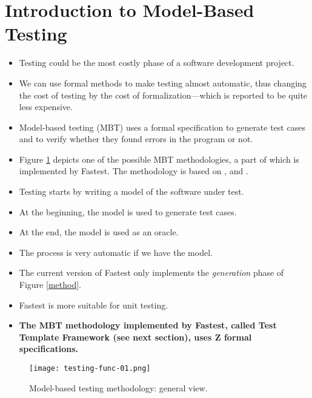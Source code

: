 \section{Introduction to Model-Based Testing}

\begin{itemize}
\item Testing could be the most costly phase of a software development project.

\item We can use formal methods to make testing almost automatic, thus changing the cost of testing by the cost of formalization---which is reported to be quite less expensive.

\item Model-based testing (MBT) uses a formal specification to generate test cases and to verify whether they found errors in the program or not.

\item Figure \ref{f:mbt} depicts one of the possible MBT methodologies, a part of which is implemented by Fastest. The methodology is based on \cite{Stocks2}, \cite{Horcher} and \cite{Stocks}.

\item Testing starts by writing a model of the software under test.

\item At the beginning, the model is used to generate test cases.

\item At the end, the model is used as an oracle.

\item The process is very automatic if we have the model.

\item The current version of Fastest only implements the {\it generation} phase of Figure \ref{method}.

\item Fastest is more suitable for unit testing.

\item {\bf The MBT methodology implemented by Fastest, called Test Template Framework (see next section), uses Z formal specifications.}
\end{itemize}

\begin{figure}[h]
\begin{center}
\texttt{[image: testing-func-01.png]} 
\caption{\label{f:mbt}Model-based testing methodology: general view.}
\end{center}
\end{figure}







